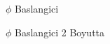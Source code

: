 \documentclass[12pt,fleqn]{article}
\begin{document}
\begin{figure}[!hbp]
\caption{$\phi$ Baslangici}
\end{figure}


\begin{figure}[!hbp]
\caption{$\phi$ Baslangici 2 Boyutta}
\end{figure}
\end{document}
